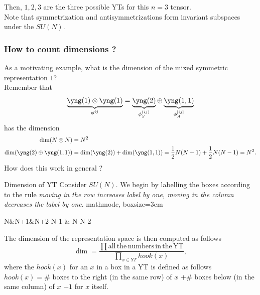 Then, $1,2,3$ are the three possible YTs for this $n=3$ tensor.\\
Note that symmetrization and antisymmetrizations form invariant subspaces under the $SU(N)$.
\subsubsection{How to count dimensions ?}
As a motivating example, what is the dimension of the mixed symmetric representation $1$?\\
Remember that
\begin{equation}
	\underbrace{\yng(1) \otimes \yng(1)}_{\phi^{ij}} = \underbrace{\yng(2)}_{\phi^{(ij)}_S} \oplus \underbrace{\yng(1,1)}_{\phi^{[ij]}_A} 
\end{equation}
has the dimension 
\begin{align*}
	\dim(N\otimes N) &=N^2 \\
	\dim(\yng(2) \oplus \yng(1,1)) &= \dim(\yng(2)) +\dim(\yng(1,1)) = \half N(N+1) + \half N(N-1) = N^2.
\end{align*}
How does this work in general ?\\
\begin{mybox}{Dimension of YT}
Consider $SU(N)$. We begin by labelling the boxes according to the rule \emph{moving in the row increases label by one, moving in the column decreases the label by one}.
\ytableausetup
{mathmode, boxsize=3em}
\begin{ytableau}
	N&N+1&N+2 \cr 
	N-1 & N \cr 
	N-2 \cr
\end{ytableau}
The dimension of the representation space is then computed as follows
\begin{equation}
	\label{eq:dimrepspace}
	\dim = \frac{\prod \mathrm{all\,the\,numbers\,in\,the\,YT}}{\prod_{x\in YT} hook(x)},
\end{equation}
where the $hook(x)$ for an $x$ in a box in a YT is defined as follows $hook(x) = \#$ boxes to the right (in the same row) of $x$ $+\#$ boxes below (in the same column) of $x$ $+1$ for $x$ itself.
\end{mybox}
